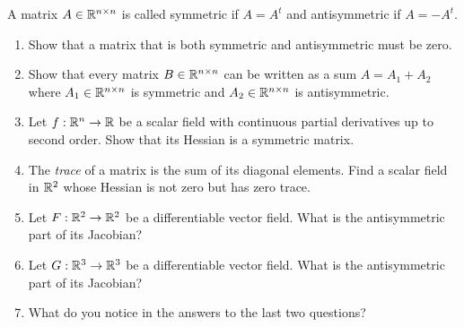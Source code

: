 \documentclass[11pt]{article}
\begin{document}
\begin{exercise}
    A matrix $A \in \mathbb{R}^{n \times n}$ is called symmetric if $A = A^{t}$ and antisymmetric if $A = - A^{t}$. 
    \begin{enumerate}
     \item Show that a matrix that is both symmetric and antisymmetric must be zero.
     \item Show that every matrix $B \in \mathbb{R}^{n \times n}$ can be written as a sum $A = A_1 + A_2$ where $A_1 \in \mathbb{R}^{n \times n}$ is symmetric and $A_2 \in \mathbb{R}^{n \times n}$ is antisymmetric. 
     \item Let $f : \mathbb{R}^{n} \rightarrow \mathbb{R}$ be a scalar field with continuous partial derivatives up to second order. 
     Show that its Hessian is a symmetric matrix.
     \item The \emph{trace} of a matrix is the sum of its diagonal elements. Find a scalar field in $\mathbb{R}^{2}$ whose Hessian is not zero but has zero trace.
     \item Let $F : \mathbb{R}^{2} \rightarrow \mathbb{R}^{2}$ be a differentiable vector field. What is the antisymmetric part of its Jacobian?
     \item Let $G : \mathbb{R}^{3} \rightarrow \mathbb{R}^{3}$ be a differentiable vector field. What is the antisymmetric part of its Jacobian?
     \item What do you notice in the answers to the last two questions?
    \end{enumerate}
\end{exercise}
\end{document}

